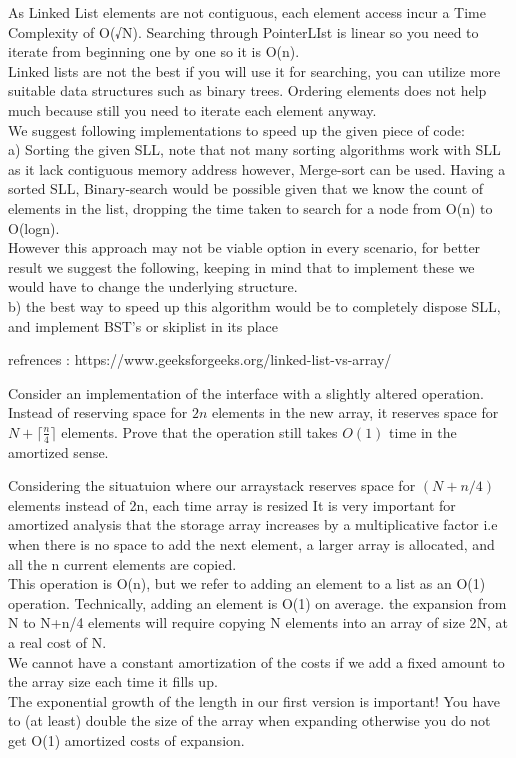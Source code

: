\documentclass[addpoints]{exam}
\begin{document}
\begin{questions}
\begin{solution}
As Linked List elements are not contiguous, each element access incur a Time Complexity of O(√N).
Searching through PointerLIst is linear so you need to iterate from beginning one by one so it is O(n).\\ Linked lists are not the best if you will use it for searching, you can utilize more suitable data structures such as binary trees. Ordering elements does not help much because still you need to iterate each element  anyway.\\
We suggest following implementations to speed up the given piece of code:\\
a) Sorting the given SLL, note that not many sorting algorithms work with SLL as it lack contiguous memory address however, Merge-sort can be used. Having a sorted SLL, Binary-search would be possible given that we know the count of elements in the list, dropping the time taken to search for a node from O(n) to O(logn).\\
However this approach may not be viable option in every scenario, for better result we suggest the following, keeping in mind that to implement these we would have to change the underlying structure.\\
b) the best way to speed up this algorithm would be to completely dispose SLL, and implement BST's or skiplist in its place


refrences : https://www.geeksforgeeks.org/linked-list-vs-array/\\
    \end{solution}

    Consider an  implementation of the  interface with a slightly altered  operation. Instead of reserving space for $2n$ elements in the new array, it reserves space for $N + \lceil \frac{n}{4} \rceil$ elements. Prove that the  operation still takes $O(1)$ time in the amortized sense.
    \begin{solution}
      Considering the situatuion where our arraystack reserves space for $(N + n/4)$ elements instead of 2n, each time array is resized It is very important for amortized analysis that the storage array increases by a multiplicative factor i.e when there is no space to add the next element, a larger array is allocated, and all the n current elements are copied. \\ This operation is O(n), but we refer to adding an element to a list as an O(1) operation.  Technically, adding an element is O(1) on average. the expansion from N to N+n/4 elements will require copying N elements into an array of size 2N, at a real cost of N.\\  We cannot have a constant amortization of the costs if we add a fixed amount to the array size each time it fills up.\\  The exponential growth of the length in our first version is important! You have to (at least) double the size of the array when expanding otherwise you do not get O(1) amortized costs of expansion.\\
      

\end{solution}
\end{questions}
\end{document}
